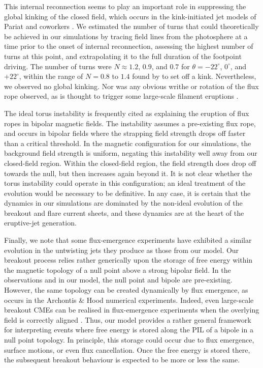 \documentclass[twocolumn]{aastex6}
\begin{document}
This internal reconnection seems to play an important role in suppressing the global kinking of the closed field, which occurs in the kink-initiated jet models of Pariat and coworkers \citep[e.g.][]{Pariat2009}. We estimated the number of turns that could theoretically be achieved in our simulations by tracing field lines from the photosphere at a time prior to the onset of internal reconnection, assessing the highest number of turns at this point, and extrapolating it to the full duration of the footpoint driving. The number of turns were $N \approx 1.2$, $0.9$, and $0.7$ for $\theta = -22^\circ$, $0^\circ$, and $+22^\circ$, within the range of $N = 0.8$ to $1.4$ found by \citet{Pariat2010} to set off a kink. Nevertheless, we observed no global kinking. Nor was any obvious writhe or rotation of the flux rope observed, as is thought to trigger some large-scale filament eruptions \citep{Torok2005}. 

The ideal torus instability \citep{Kliem2006} is frequently cited as explaining the eruption of flux ropes in bipolar magnetic fields. The instability assumes a pre-existing flux rope, and occurs in bipolar fields where the strapping field strength drops off faster than a critical threshold. In the magnetic configuration for our simulations, the background field strength is uniform, negating this instability well away from our closed-field region. Within the closed-field region, the field strength does drop off towards the null, but then increases again beyond it. It is not clear whether the torus instability could operate in this configuration; an ideal treatment of the evolution would be necessary to be definitive. In any case, it is certain that the dynamics in our simulations are dominated by the non-ideal evolution of the breakout and flare current sheets, and these dynamics are at the heart of the eruptive-jet generation.

Finally, we note that some flux-emergence experiments \citep[e.g.][]{Archontis2013} have exhibited a similar evolution in the untwisting jets they produce as those from our model. Our breakout process relies rather generically upon the storage of free energy within the magnetic topology of a null point above a strong bipolar field. In the observations and in our model, the null point and bipole are pre-existing. However, the same topology can be created dynamically by flux emergence, as occurs in the Archontis \& Hood numerical experiments. Indeed, even large-scale breakout CMEs can be realised in flux-emergence experiments when the overlying field is correctly aligned \citep[e.g.][]{Archontis2008,Hood2012,Leake2014}. Thus, our model provides a rather general framework for interpreting events where free energy is stored along the PIL of a bipole in a null point topology. In principle, this storage could occur due to flux emergence, surface motions, or even flux cancellation. Once the free energy is stored there, the subsequent breakout behaviour is expected to be more or less the same. 
\end{document}
